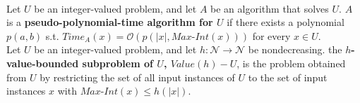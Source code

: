 \begin{tabu}
{}\\ \hline
  {Let $U$ be an integer-valued problem, and let $A$ be an algorithm that solves
    $U$. $A$ is a {\bf pseudo-polynomial-time algorithm for $U$} if there exists
    a polynomial $p(a,b)$ s.t. $Time_A(x) = \mathcal{O}(p(|x|,
    Max\text{-}Int(x)))$ for every $x \in U$.} \\ \hline
  {Let $U$ be an integer-valued problem, and let $h : \mathcal{N} \rightarrow
    \mathcal{N}$ be nondecreasing. the {\bf $h$-value-bounded subproblem of $U$,
  $Value(h)-U$}, is the problem obtained from $U$ by restricting the set of all
    input instances of $U$ to the set of input instances $x$ with
    $Max\text{-}Int(x) \leq h(|x|)$.} \\ \hline
\end{tabu}

